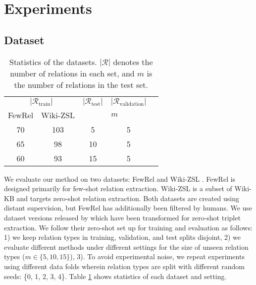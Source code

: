 \section{Experiments}

\subsection{Dataset}

\begin{table}[t]
    \centering
    \small
    \begin{tabular}{ccccc}
    \toprule
          \multicolumn{2}{c}{$|\mathcal{R}_{\text{train}}|$}  & $|\mathcal{R}_{\text{test}}|$ & $|\mathcal{R}_{\text{validation}}|$ \\
          FewRel  & Wiki-ZSL & \multicolumn{2}{c}{$m$} & \\ \midrule
         70  & 103 & 5 & 5  \\
         65  & 98 & 10 & 5  \\
         60  & 93 & 15 & 5  \\ \bottomrule
    \end{tabular}
    \caption{Statistics of the datasets. $|\mathcal{R}|$ denotes the number of relations in each set, and $m$ is the number of relations in the test set.}
    \label{tab:stat_data}
\end{table}

We evaluate our method on two datasets: FewRel \citep{han-etal-2018-fewrel} and Wiki-ZSL \citep{chen-li-2021-zs}. FewRel is designed primarily for few-shot relation extraction. Wiki-ZSL is a subset of Wiki-KB and targets zero-shot relation extraction. Both datasets are created using distant supervision, but FewRel has  additionally been filtered by humans.
We use dataset versions released by \citet{chia-etal-2022-relationprompt} which have been transformed for zero-shot triplet extraction.
We follow their zero-shot set up for training and evaluation as follows:
1) we keep relation types in training, validation, and test splits disjoint, 2) we evaluate different methods under different settings for the size of unseen relation types ($m \in \{5, 10, 15\}$), 3). To avoid experimental noise, we repeat experiments using different data folds wherein relation types are split with different random seeds: \{0, 1, 2, 3, 4\}. 
Table \ref{tab:stat_data} shows statistics of each dataset and setting.

